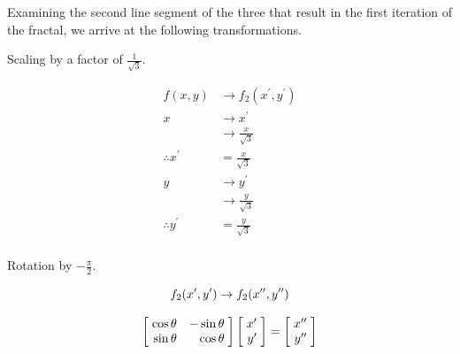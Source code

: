 \documentclass[a4paper]{article}
\begin{document}
\begin{enumerate}[label=\textbf{\arabic*.}]
\begin{enumerate}
		\pagebreak

		Examining the second line segment of the three that result in the first iteration of the fractal, we arrive at the following transformations.

		\bigbreak

		\begin{center}
		Scaling by a factor of $\frac{1}{\sqrt{3}}$.
		\end{center}

		\begin{align*}
		f(x,y) & \rightarrow f_2(x^{\prime},y^{\prime})\\
		x & \rightarrow x^{\prime}\\
		& \rightarrow \frac{x}{\sqrt{3}}\\
		\therefore x^{\prime} & = \frac{x}{\sqrt{3}}\\
		y & \rightarrow y^{\prime}\\
		& \rightarrow \frac{y}{\sqrt{3}}\\
		\therefore y^{\prime} & = \frac{y}{\sqrt{3}}\\
		\end{align*}

		\begin{center}
		Rotation by $-\frac{\pi}{2}$.
		\end{center}

		\begin{equation*}
		f_2(x^{\prime},y^{\prime}) \rightarrow f_2(x^{\prime \prime},y^{\prime \prime})\\
		\end{equation*}

		\begin{equation*}
		\begin{bmatrix*}[r]
			\hspace{1mm} \cos{\theta} & -\sin{\theta} \hspace{1mm}\\
			\hspace{1mm} \sin{\theta} & \cos{\theta} \hspace{1mm}\\
		\end{bmatrix*}
		\begin{bmatrix*}[r]
			\hspace{1mm} x^{\prime} \hspace{1mm}\\
			\hspace{1mm} y^{\prime} \hspace{1mm}\\
		\end{bmatrix*}
		=
		\begin{bmatrix*}[r]
			\hspace{1mm} x^{\prime \prime} \hspace{1mm}\\
			\hspace{1mm} y^{\prime \prime} \hspace{1mm}\\
		\end{bmatrix*}
		\end{equation*}


\end{enumerate}
\end{enumerate}
\end{document}
